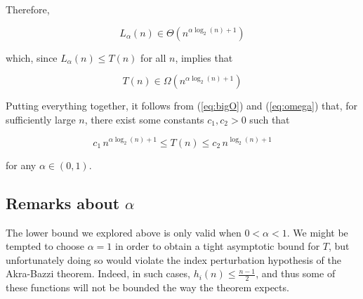 \documentclass[a4paper,10pt]{article}
\begin{document}
Therefore,

$$L_{\alpha}(n) \in \Theta \left(n^{\alpha \log_2(n) + 1}\right)$$

which, since $L_{\alpha}(n) \leq T(n)$ for all $n$, implies that

\begin{equation}
\label{eq:omega}
    T(n) \in \Omega \left(n^{\alpha \log_2(n) + 1}\right)
\end{equation}

\vspace{1cm}

Putting everything together, it follows from (\ref{eq:bigO}) and (\ref{eq:omega}) that, for sufficiently large $n$, there exist some constants $c_1, c_2 > 0$ such that

$$c_1 \, n^{\alpha \log_2(n) + 1} \leq T(n) \leq c_2 \, n^{{\log_2(n) + 1}}$$

for any $\alpha \in (0, 1)$.

\subsection{Remarks about $\alpha$}

The lower bound we explored above is only valid when $0 < \alpha < 1$. We might be tempted to choose $\alpha = 1$ in order to obtain a tight asymptotic bound for $T$, but unfortunately doing so would violate the index perturbation hypothesis of the Akra-Bazzi theorem. Indeed, in such cases, $h_i(n) \leq \frac{n-1}{2}$, and thus some of these functions will not be bounded the way the theorem expects.

 

\end{document}
